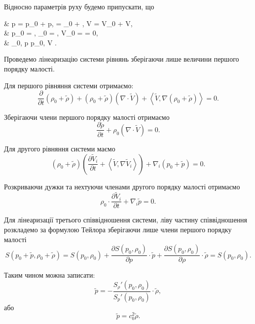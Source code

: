 Відносно параметрів руху будемо припускати, що
\begin{system}
	& p = p_0 + \tilde p, \quad \rho = \rho_0 + \tilde \rho, \quad V = V_0 + \tilde V, \\
	& p_0 = \const, \quad \rho_0 = \const, \quad V_0 = \const = 0, \\
	& \tilde \rho \ll \rho_0, \quad \tilde p \ll p_0, \quad \tilde V .
\end{system}

Проведемо лінеаризацію системи рівнянь зберігаючи лише величини першого порядку малості. \medskip

Для першого рівняння системи отримаємо:
\begin{equation}
	\frac{\partial}{\partial t} (\rho_0 + \tilde \rho) + (\rho_0 + \tilde \rho) (\nabla \cdot \tilde V) + \left\langle \tilde V, \nabla (\rho_0 + \tilde \rho) \right\rangle = 0.
\end{equation}

Зберігаючи члени першого порядку малості отримаємо
\begin{equation}
	\frac{\partial \tilde \rho}{\partial t} + \rho_0 (\nabla \cdot \tilde V) = 0.
\end{equation}

Для другого рівняння системи маємо
\begin{equation}
	(\rho_0 + \tilde \rho) \left( \frac{\partial \tilde V_i}{\partial t} + \left\langle \tilde V, \nabla \tilde V_i \right\rangle \right) + \nabla_i (p_0 + \tilde p) = 0.
\end{equation}

Розкриваючи дужки та нехтуючи членами другого порядку малості отримаємо
\begin{equation}
	\rho_0 \cdot \frac{\partial \tilde V_i}{\partial t} + \nabla_i \tilde p = 0.
\end{equation}

Для лінеаризації третього співвідношення системи, ліву частину співвідношення розкладемо за формулою Тейлора зберігаючи лише члени першого порядку малості
\begin{equation}
	S(p_0 + \tilde p, \rho_0 + \tilde \rho) = S(p_0, \rho_0) + \frac{\partial S(p_0, \rho_0)}{\partial p} \cdot \tilde p + \frac{\partial S(p_0, \rho_0)}{\partial \rho} \cdot \tilde \rho = S(p_0, \rho_0).
\end{equation}

Таким чином можна записати:
\begin{equation}
	\tilde p = - \frac{S_\rho' (p_0, \rho_0)}{S_p'(p_0, \rho_0)} \cdot \tilde \rho,
\end{equation}
або
\begin{equation}
	\tilde p = c_0^2 \tilde \rho.
\end{equation}

